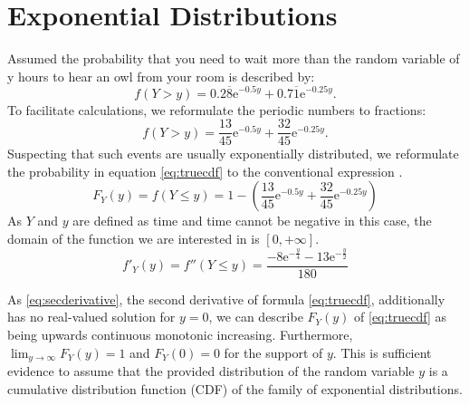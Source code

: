 \section{Exponential Distributions}
Assumed the probability that you need to wait more than the random variable of y hours to hear an owl from your room is described by:
\begin{equation}  f(Y > y) = 0.2\overline{8}\mathrm{e}^{-0.5y} + 0.7\overline{1}\mathrm{e}^{-0.25y}.
\label{eq:initcdf}
\end{equation}
To facilitate calculations, we reformulate the periodic numbers to fractions:
\begin{equation}  f(Y > y) = \dfrac{13}{45}\mathrm{e}^{-0.5y} + \dfrac{32}{45}\mathrm{e}^{-0.25y}.
\label{eq:initcdffractioned}
\end{equation}
Suspecting that such events are usually exponentially distributed, we reformulate the probability in equation \eqref{eq:truecdf} to the conventional expression \cite{deisenroth}. 
\begin{equation}  F_Y(y) = f(Y \leq y) =1-\left( \dfrac{13}{45}\mathrm{e}^{-0.5y} + \dfrac{32}{45}\mathrm{e}^{-0.25y} \right)
\label{eq:truecdf}
\end{equation}
As $Y$ and $y$ are defined as time and time cannot be negative in this case, the domain of the function we are interested in is $[0,+\infty]$.
\begin{equation} f'_Y(y) = f''(Y \leq y) = 
\dfrac{-8\mathrm{e}^{-\frac{y}{4}}-13\mathrm{e}^{-\frac{y}{2}}}{180}
\label{eq:secderivative}
\end{equation}

As \eqref{eq:secderivative}, the second derivative of formula \eqref{eq:truecdf},  additionally has no real-valued solution for $y=0$, we can describe $F_Y(y)$ of \eqref{eq:truecdf} as being upwards continuous monotonic increasing. Furthermore, $\lim_{y\to\infty} F_Y(y)= 1$ and $F_Y(0)= 0$ for the support of $y$. This is sufficient evidence to assume that the provided distribution of the random variable $y$ is a cumulative distribution function (CDF) of the family of exponential distributions. 

